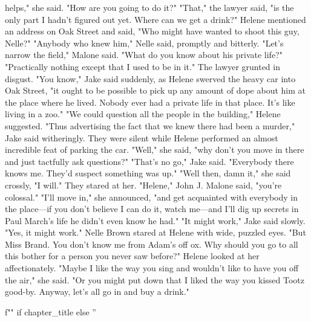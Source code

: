 \documentclass{novel}
\begin{document}
helps," she said. "How are you going to do it?" "That," the lawyer said, "is the only part I hadn't figured out yet. Where can we get a drink?" Helene mentioned an address on Oak Street and said, "Who might have wanted to shoot this guy, Nelle?" "Anybody who knew him," Nelle said, promptly and bitterly. "Let’s narrow the field," Malone said. "What do you know about his private life?" "Practically nothing except that I used to be in it." The lawyer grunted in disgust. "You know," Jake said suddenly, as Helene swerved the heavy car into Oak Street, "it ought to be possible to pick up any amount of dope about him at the place where he lived. Nobody ever had a private life in that place. It’s like living in a zoo." "We could question all the people in the building," Helene suggested. "Thus advertising the fact that we knew there had been a murder," Jake said witheringly. They were silent while Helene performed an almost incredible feat of parking the car. "Well," she said, "why don’t you move in there and just tactfully ask questions?" "That’s no go," Jake said. "Everybody there knows me. They’d suspect something was up." "Well then, damn it," she said crossly, "I will." They stared at her. "Helene," John J. Malone said, "you’re colossal." "I'll move in," she announced, "and get acquainted with everybody in the place—if you don’t believe I can do it, watch me—and I'll dig up secrets in Paul March’s life he didn’t even know he had." "It might work," Jake said slowly. "Yes, it might work." Nelle Brown stared at Helene with wide, puzzled eyes. "But Miss Brand. You don’t know me from Adam’s off ox. Why should you go to all this bother for a person you never saw before?" Helene looked at her affectionately. "Maybe I like the way you sing and wouldn’t like to have you off the air," she said. "Or you might put down that I liked the way you kissed Tootz good-by. Anyway, let’s all go in and buy a drink."

\begin{ChapterStart}
\vspace{3\nbs}
f"" if chapter_title else ''
\end{ChapterStart}
\end{document}
